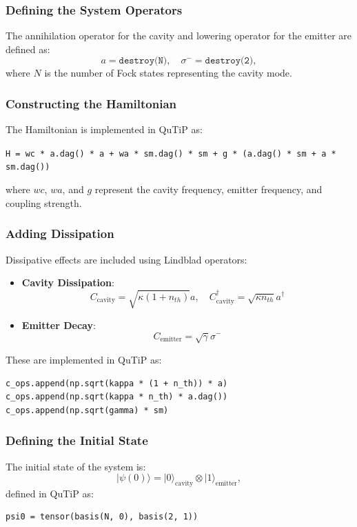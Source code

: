 \documentclass[conference]{IEEEtran}
\begin{document}
\subsubsection{Defining the System Operators}
The annihilation operator for the cavity and lowering operator for the emitter are defined as:
\begin{equation}
a = \texttt{destroy(N)}, \quad \sigma^- = \texttt{destroy(2)},
\end{equation}
where $N$ is the number of Fock states representing the cavity mode.

\subsubsection{Constructing the Hamiltonian}
The Hamiltonian is implemented in QuTiP as:

\texttt{H = wc * a.dag() * a + wa * sm.dag() * sm + g * (a.dag() * sm + a * sm.dag())}

where $wc$, $wa$, and $g$ represent the cavity frequency, emitter frequency, and coupling strength.

\subsubsection{Adding Dissipation}
Dissipative effects are included using Lindblad operators:
\begin{itemize}
    \item \textbf{Cavity Dissipation}:
    \begin{equation}
    C_{\text{cavity}} = \sqrt{\kappa(1 + n_{th})}a, \quad C_{\text{cavity}}^\dagger = \sqrt{\kappa n_{th}}a^\dagger
    \end{equation}
    \item \textbf{Emitter Decay}:
    \begin{equation}
    C_{\text{emitter}} = \sqrt{\gamma}\sigma^-
    \end{equation}
\end{itemize}
These are implemented in QuTiP as:
{\scriptsize
\begin{verbatim}
c_ops.append(np.sqrt(kappa * (1 + n_th)) * a)
c_ops.append(np.sqrt(kappa * n_th) * a.dag())
c_ops.append(np.sqrt(gamma) * sm)
\end{verbatim}
}

\subsubsection{Defining the Initial State}
The initial state of the system is:
\begin{equation}
|\psi(0)\rangle = |0\rangle_{\text{cavity}} \otimes |1\rangle_{\text{emitter}},
\end{equation}
defined in QuTiP as:
\begin{verbatim}
psi0 = tensor(basis(N, 0), basis(2, 1))
\end{verbatim}
\end{document}
